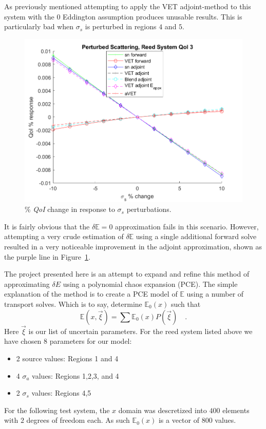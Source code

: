 \documentclass{article}
\newcommand{\Edd}{\mathbb{E}}
\newcommand{\sigs}{\sigma_s}
\newcommand{\siga}{\sigma_a}
\newcommand{\qoi}{{\it QoI}\xspace}
\newcommand{\tcr}[1]{\textcolor{red}{#1}}
\begin{document}
As previously mentioned attempting to apply the VET adjoint-method to this system with the $0$ Eddington assumption produces unusable results. This is particularly bad when $\sigs$ is perturbed in regions $4$ and $5$.
\begin{figure}[H]
\centering
  \includegraphics[width=0.8\linewidth]{772sigsSens.png}
  \caption{\% \qoi change in response to $\sigs$ perturbations.}
\label{fig:thesissens}
\end{figure}
It is fairly obvious that the $\delta \Edd=0$ approximation fails in this scenario. However, attempting a very crude estimation of $\delta \Edd$ using a single additional forward solve resulted in a very noticeable improvement in the adjoint approximation, shown as the purple line in Figure~\ref{fig:thesissens}.


The project presented here is an attempt to expand and refine this method of approximating $\delta E$ using a polynomial chaos expansion (PCE). The simple explanation of the method is to create a PCE model of $\Edd$ using a number of transport solves. Which is to say, determine $\Edd_0(x)$ such that
\begin{equation}
\Edd(x,\vec{\xi}) = \sum \Edd_0(x)P(\vec{\xi}) \quad.
\end{equation}
Here $\vec{\xi}$ is our list of uncertain parameters. For the reed system listed above we have chosen $8$ parameters for our model:
\begin{itemize}
\item 2 source values: Regions 1 and 4
\item 4 $\siga$ values: Regions 1,2,3, and 4
\item 2 $\sigs$ values: Regions 4,5
\end{itemize}
For the following test system, the $x$ domain was descretized into $400$ elements with $2$ degrees of freedom each. As such $\Edd_0(x)$ is a vector of $800$ values.
\end{document}
